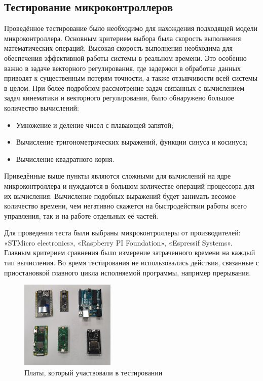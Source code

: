 \subsection{Тестирование микроконтроллеров}

Проведённое тестирование было необходимо для нахождения подходящей модели микроконтроллера. Основным критерием выбора была скорость выполнения математических операций. Высокая скорость выполнения необходима для обеспечения эффективной работы системы в реальном времени. Это особенно важно в задаче векторного регулирования, где задержки в обработке данных приводят к существенным потерям точности, а также отзывчивости всей системы в целом.	При более подробном рассмотрение задач связанных с вычислением задач кинематики и векторного регулирования, было обнаружено большое количество вычислений\citep{5899203}:
\begin{itemize}
	\item Умножение и деление чисел с плавающей запятой;
	\item Вычисление тригонометрических выражений, функции синуса и косинуса;
	\item Вычисление квадратного корня.
\end{itemize}

Приведённые выше пункты являются сложными для вычислений на ядре микроконтроллера и нуждаются в большом количестве операций процессора для их вычисления.  Вычисление подобных выражений будет занимать весомое количество времени, чем негативно скажется на быстродействии работы всего управления, так и на работе отдельных её частей\citep{pack2008microcontroller}.


Для проведения теста были выбраны микроконтроллеры от производителей: «STMicro electronics», «Raspberry PI Foundation», «Espressif Systems».
Главным критерием сравнения было измерение затраченного времени на каждый тип вычисления. Во время тестирования не использовались действия, связанные с приостановкой главного цикла исполняемой программы, например прерывания.

\begin{figure}[H]
	\centering
	\includegraphics[width=0.4\textwidth]{Src/images/TestDevices.png}
	\caption{Платы, который участвовали в тестировании}
	\label{Test}
\end{figure}

